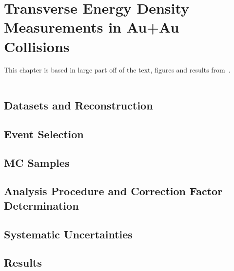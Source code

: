 \chapter{Transverse Energy Density Measurements in Au+Au Collisions}
\label{ch:detdeta_auau}

\quad This chapter is based in large part off of the text, figures and results from~\cite{ppg03AN,sphenix_detdeta}.
\\
\\


\section{Datasets and Reconstruction}
\label{sec:detdeta_datasets}


\section{Event Selection}
\label{sec:detdeta_selection}


\section{MC Samples}
\label{sec:detdeta_mcsamples}


\section{Analysis Procedure and Correction Factor Determination}
\label{sec:detdeta_anacorr}


\section{Systematic Uncertainties}
\label{sec:detdeta_systematics}

\clearpage

\section{Results}
\label{sec:detdeta_results}
 